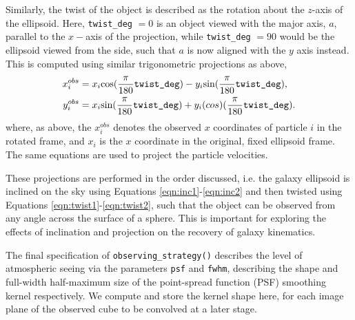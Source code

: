 \documentclass[
  journal=pasa,
  manuscript=research-paper, %
  year=2020,
  volume=37,
]{cup-journal}
\newcommand{\observingstrategy}[1]{\texttt{observing\_strategy()}#1}
\begin{document}
Similarly, the twist of the object is described as the rotation about the $z$-axis of the ellipsoid. 
Here, \texttt{twist\_deg} $= 0$ is an object viewed with the major axis, $a$, parallel to the $x-$axis of the projection, while \texttt{twist\_deg} $= 90$ would be the ellipsoid viewed from the side, such that $a$ is now aligned with the $y$ axis instead. 
This is computed using similar trigonometric projections as above, 
\begin{align} \label{eqn:twist1}
    x^{obs}_i &= x_i \text{cos}(\frac{\pi}{180} \texttt{twist\_deg}) - y_i \text{sin} (\frac{\pi}{180} \texttt{twist\_deg}), \\
    y^{obs}_i &= x_i \text{sin} (\frac{\pi}{180} \texttt{twist\_deg}) + y_i \text(cos) (\frac{\pi}{180} \texttt{twist\_deg}). \label{eqn:twist2}
\end{align}
where, as above, the $x^{obs}_i$ denotes the observed $x$  coordinates of particle $i$ in the rotated frame, and $x_i$ is the $x$ coordinate in the original, fixed ellipsoid frame. 
The same equations are used to project the particle velocities.

These projections are performed in the order discussed, i.e. the galaxy ellipsoid is inclined on the sky using Equations \ref{eqn:inc1}-\ref{eqn:inc2} and then twisted using Equations \ref{eqn:twist1}-\ref{eqn:twist2}, such that the object can be observed from any angle across the surface of a sphere. 
This is important for exploring the effects of inclination and projection on the recovery of galaxy kinematics.

The final specification of \observingstrategy{} describes the level of atmospheric seeing via the parameters \texttt{psf} and \texttt{fwhm}, describing the shape and full-width half-maximum size of the point-spread function (PSF) smoothing kernel respectively. 
We compute and store the kernel shape here, for each image plane of the observed cube to be convolved at a later stage. 
\end{document}
